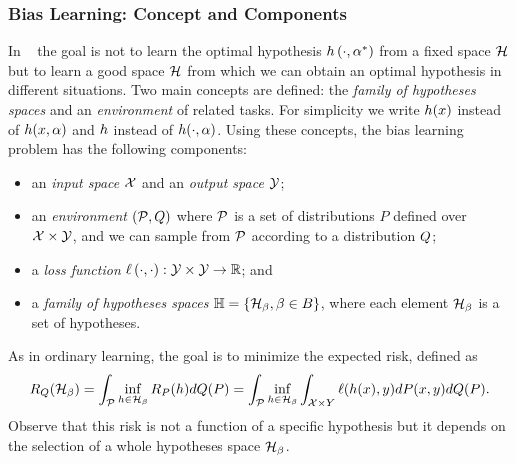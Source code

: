 

\subsubsection*{Bias Learning: Concept and Components}
In ~\cite{baxter2000model} the goal is not to learn the optimal hypothesis $h\left(\cdot, \alpha^*\right)$ from a fixed space $\mathcal{H}$ but to learn a good space $\mathcal{H}$ from which we can obtain an optimal hypothesis in different situations.
%
Two main concepts are defined: the \emph{family of hypotheses spaces} and an \emph{environment} of related tasks. 
For simplicity we write $h(x)$ instead of $h(x, \alpha)$ and $h$ instead of $h(\cdot, \alpha)$.
Using these concepts, the bias learning problem has the following components:
\begin{itemize}
    \item an \emph{input space} $\mathcal{X}$ and an \emph{output space} $\mathcal{Y}$;
    \item an \emph{environment} $(\mathcal{P}, Q)$ where $\mathcal{P}$ is a set of distributions $P$ defined over $\mathcal{X} \times \mathcal{Y}$, and we can sample from $\mathcal{P}$ according to a distribution $Q$;
    \item a \emph{loss function} $\ell\left( \cdot, \cdot\right):\mathcal{Y} \times \mathcal{Y} \to \mathbb{R}$; and
    \item a \emph{family of hypotheses spaces} $\mathbb{H} = \left\{\mathcal{H}_\beta, \beta \in B\right\}$, where each element $\mathcal{H}_\beta$ is a set of hypotheses.
\end{itemize}
As in ordinary learning, the goal is to minimize the expected risk, defined as
\begin{equation}\label{eq:biaslearn_exprisk}
    \bexprisk(\hypspace_\fparam) = \int_{\bprobspace} \inf_{\hypf \in \hypspace_\fparam} \risk_P(\hypf) d\bdistf(P) = \int_{\bprobspace} \inf_{\hypf \in \hypspace_\fparam} \int_{\Xspace \times Y} \lossf(h(x), y) dP(x, y) d\bdistf(P).
\end{equation}
Observe that this risk is not a function of a specific hypothesis but it depends on the selection of a whole hypotheses space $\mathcal{H}_\beta$.
